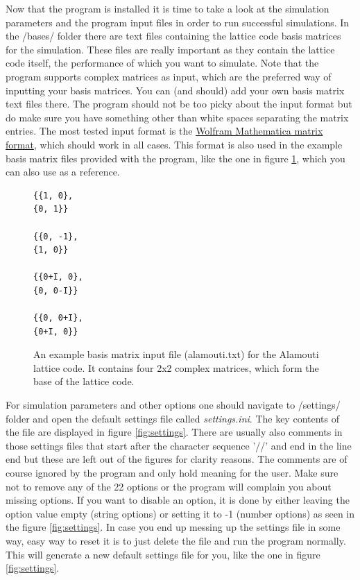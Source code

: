\documentclass[english,12pt,a4paper,pdftex,sci,utf8]{aaltothesis}
\begin{document}
Now that the program is installed it is time to take a look at the simulation parameters and the program input files in order to run successful simulations. In the /bases/ folder there are text files containing the lattice code basis matrices for the simulation. These files are really important as they contain the lattice code itself, the performance of which you want to simulate. Note that the program supports complex matrices as input, which are the preferred way of inputting your basis matrices. You can (and should) add your own basis matrix text files there. The program should not be too picky about the input format but do make sure you have something other than white spaces separating the matrix entries. The most tested input format is the \href{http://reference.wolfram.com/language/tutorial/LinearAlgebraMatrixTypes.html#77896732}{Wolfram Mathematica matrix format}, which should work in all cases. This format is also used in the example basis matrix files provided with the program, like the one in figure \ref{fig:alamouti_basis}, which you can also use as a reference.
\begin{figure}[htb]
\begin{Verbatim}[frame=single]
{{1, 0},
{0, 1}}

{{0, -1},
{1, 0}}

{{0+I, 0},
{0, 0-I}}

{{0, 0+I},
{0+I, 0}}
\end{Verbatim}
\caption{An example basis matrix input file (alamouti.txt) for the Alamouti lattice code. It contains four 2x2 complex matrices, which form the base of the lattice code.}
\label{fig:alamouti_basis}
\end{figure}

\par For simulation parameters and other options one should navigate to /settings/ folder and open the default settings file called \textit{settings.ini}. The key contents of the file are displayed in figure \ref{fig:settings}. There are usually also comments in those settings files that start after the character sequence '//' and end in the line end but these are left out of the figures for clarity reasons. The comments are of course ignored by the program and only hold meaning for the user. Make sure not to remove any of the 22 options or the program will complain you about missing options. If you want to disable an option, it is done by either leaving the option value empty (string options) or setting it to -1 (number options) as seen in the figure \ref{fig:settings}. In case you end up messing up the settings file in some way, easy way to reset it is to just delete the file and run the program normally. This will generate a new default settings file for you, like the one in figure \ref{fig:settings}. 
\end{document}
